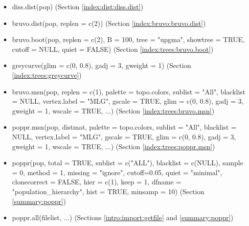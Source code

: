 \documentclass[letterpaper]{article}
\begin{document}
\begin{itemize}
\item diss.dist(pop) (Section \ref{index:dist:diss.dist})
\item bruvo.dist(pop, replen = c(2)) (Section \ref{index:bruvo:bruvo.dist})
\item bruvo.boot(pop, replen = c(2), B = 100, tree = "upgma", showtree = TRUE, cutoff = NULL, quiet = FALSE) (Section \ref{index:trees:bruvo.boot})
\item greycurve(glim = c(0, 0.8), gadj = 3, gweight = 1) (Section \ref{index:trees:greycurve})
\item bruvo.msn(pop, replen = c(1), palette = topo.colors, sublist = "All", blacklist = NULL, vertex.label = "MLG", gscale = TRUE, glim = c(0, 0.8), gadj = 3, gweight = 1, wscale = TRUE, ...) (Section \ref{index:trees:bruvo.msn})
\item poppr.msn(pop, distmat, palette = topo.colors, sublist = "All", blacklist = NULL, vertex.label = "MLG", gscale = TRUE, glim = c(0, 0.8), gadj = 3, gweight = 1, wscale = TRUE, ...) (Section \ref{index:trees:poppr.msn})
\item poppr(pop, total = TRUE, sublist = c("ALL"), blacklist = c(NULL), sample = 0, method = 1, missing = "ignore", cutoff=0.05, quiet = "minimal", clonecorrect = FALSE, hier = c(1), keep = 1, dfname = "population\_hierarchy", hist = TRUE, minsamp = 10) (Section \ref{summary:poppr})
\item poppr.all(filelist, ...) (Sections \ref{intro:import:getfile} and \ref{summary:poppr})
\end{itemize}
\normalsize


\end{document}
